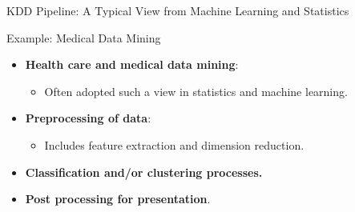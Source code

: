 \begin{frame}{KDD Pipeline: A Typical View from Machine Learning and Statistics}
\end{frame}

\begin{frame}{Example: Medical Data Mining}
	\begin{itemize}
		\item \textbf{Health care and medical data mining}:
		\begin{itemize}
			\item Often adopted such a view in statistics and machine learning.
		\end{itemize}
		\item \textbf{Preprocessing of data}:
		\begin{itemize}
			\item Includes feature extraction and dimension reduction.
		\end{itemize}
		\item \textbf{Classification and/or clustering processes.}
		\item \textbf{Post processing for presentation}.
	\end{itemize}
\end{frame}

